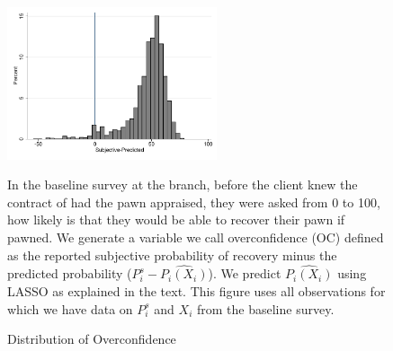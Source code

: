 \documentclass[11pt]{article}
\begin{document}
\begin{figure}[H]
        \caption{Distribution of Overconfidence}
    \label{oc_hist}
    \begin{center}
        \centering
        \includegraphics[width=0.55\textwidth]{Figuras/oc_hist.pdf}
    \end{center}
    \scriptsize
     In the baseline survey at the branch, before the client knew the contract of had the pawn appraised, they were asked from 0 to 100, how likely is that they would be able to recover their pawn if pawned. We generate a variable we call overconfidence (OC) defined as the reported subjective probability of recovery minus the predicted probability ($P^s_i-\widehat{P_i(X_i)}$). We predict $\widehat{P_i(X_i)}$ using LASSO as explained in the text. This figure uses all observations for which we have data on $P^s_i$ and $X_i$ from the baseline survey.
     
\end{figure}
\end{document}
